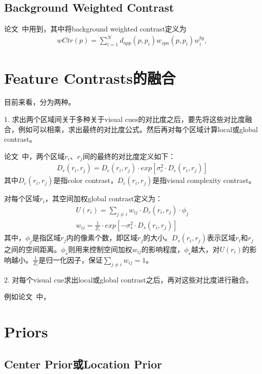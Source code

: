 \documentclass[12pt]{article}
\begin{document}
\subsection{Background Weighted Contrast}

论文~\cite{zhu2014saliency}中用到，其中将background weighted contrast定义为
\begin{align}
wCtr(p) = \sum_{i=1}^{N}d_{app}(p, p_i)w_{spa}(p, p_i)w_i^{bg},
\end{align}

\section{Feature Contrasts的融合}

目前来看，分为两种。

1. 求出两个区域间关于多种关于visual cues的对比度之后，要先将这些对比度融合，例如可以相乘，求出最终的对比度公式。然后再对每个区域计算local或global contrast。

论文~\cite{zhu2014tag}中，两个区域$r_i$、$r_j$间的最终的对比度定义如下：
\begin{align}
D_r(r_i, r_j) = D_c(r_i, r_j) \cdot exp[\sigma_e^2 \cdot D_e(r_i, r_j)]
\end{align}
其中$D_c(r_i, r_j)$是指color contrast，$D_c(r_i, r_j)$是指visual complexity contrast。

对每个区域$r_i$，其空间加权global contrast定义为：
\begin{align}
U(r_i) = \sum_{j\ne i}w_{ij} \cdot D_r(r_i, r_j) \cdot \phi_j\\
w_{ij} = \frac{1}{Z_i}\cdot exp[-\sigma_s^2 \cdot D_s(r_i, r_j)]
\end{align}
其中，$\phi_j$是指区域$r_j$内的像素个数，即区域$r_j$的大小。$D_s(r_i, r_j)$表示区域$r_i$和$r_j$之间的空间距离。$\phi_s$则用来控制空间加权$w_{ij}$的影响程度，$\phi_s$越大，对$U(r_i)$的影响越小。$\frac{1}{Z_i}$是归一化因子，保证$\sum_{j \ne i}w_{ij} = 1$。

2. 对每个visual cue求出local或global contrast之后，再对这些对比度进行融合。

例如论文~\cite{yan2013hierarchical}中，

\section{Priors}

\subsection{Center Prior或Location Prior}
\end{document}
